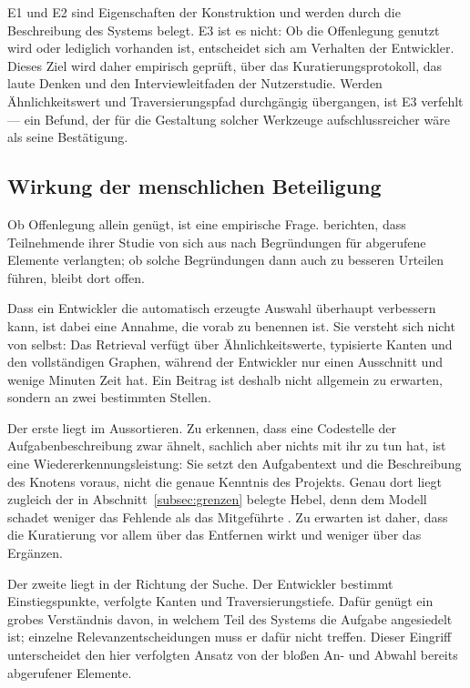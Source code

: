 E1 und E2 sind Eigenschaften der Konstruktion und werden durch die Beschreibung des Systems belegt. E3 ist es nicht: Ob die Offenlegung genutzt wird oder lediglich vorhanden ist, entscheidet sich am Verhalten der Entwickler. Dieses Ziel wird daher empirisch geprüft, über das Kuratierungsprotokoll, das laute Denken und den Interviewleitfaden der Nutzerstudie. Werden Ähnlichkeitswert und Traversierungspfad durchgängig übergangen, ist E3 verfehlt --- ein Befund, der für die Gestaltung solcher Werkzeuge aufschlussreicher wäre als seine Bestätigung.

\subsection{Wirkung der menschlichen Beteiligung}

Ob Offenlegung allein genügt, ist eine empirische Frage. \textcite{romerolauro2025raggy} berichten, dass Teilnehmende ihrer Studie von sich aus nach Begründungen für abgerufene Elemente verlangten; ob solche Begründungen dann auch zu besseren Urteilen führen, bleibt dort offen.

Dass ein Entwickler die automatisch erzeugte Auswahl überhaupt verbessern kann, ist dabei eine Annahme, die vorab zu benennen ist. Sie versteht sich nicht von selbst: Das Retrieval verfügt über Ähnlichkeitswerte, typisierte Kanten und den vollständigen Graphen, während der Entwickler nur einen Ausschnitt und wenige Minuten Zeit hat. Ein Beitrag ist deshalb nicht allgemein zu erwarten, sondern an zwei bestimmten Stellen.

Der erste liegt im Aussortieren. Zu erkennen, dass eine Codestelle der Aufgabenbeschreibung zwar ähnelt, sachlich aber nichts mit ihr zu tun hat, ist eine Wiedererkennungsleistung: Sie setzt den Aufgabentext und die Beschreibung des Knotens voraus, nicht die genaue Kenntnis des Projekts. Genau dort liegt zugleich der in Abschnitt~\ref{subsec:grenzen} belegte Hebel, denn dem Modell schadet weniger das Fehlende als das Mitgeführte \parencite{liu2023lostmiddle,du2025contextlength}. Zu erwarten ist daher, dass die Kuratierung vor allem über das Entfernen wirkt und weniger über das Ergänzen.

Der zweite liegt in der Richtung der Suche. Der Entwickler bestimmt Einstiegspunkte, verfolgte Kanten und Traversierungstiefe. Dafür genügt ein grobes Verständnis davon, in welchem Teil des Systems die Aufgabe angesiedelt ist; einzelne Relevanzentscheidungen muss er dafür nicht treffen. Dieser Eingriff unterscheidet den hier verfolgten Ansatz von der bloßen An- und Abwahl bereits abgerufener Elemente.

